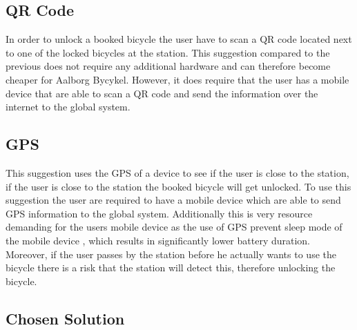 \subsection{QR Code}
In order to unlock a booked bicycle the user have to scan a QR code located next to one of the locked bicycles at the station.
This suggestion compared to the previous does not require any additional hardware and can therefore become cheaper for Aalborg Bycykel.
However, it does require that the user has a mobile device that are able to scan a QR code and send the information over the internet to the global system.

\subsection{GPS}
This suggestion uses the GPS of a device to see if the user is close to the station, if the user is close to the station the booked bicycle will get unlocked.
To use this suggestion the user are required to have a mobile device which are able to send GPS information to the global system.
Additionally this is very resource demanding for the users mobile device as the use of GPS prevent sleep mode of the mobile device \citep{misc:gpsbatteryusage}, which results in significantly lower battery duration.
Moreover, if the user passes by the station before he actually wants to use the bicycle there is a risk that the station will detect this, therefore unlocking the bicycle.

\subsection{Chosen Solution}
